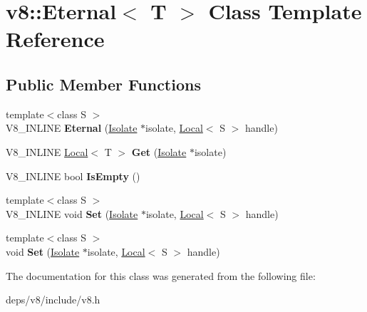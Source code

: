 \hypertarget{classv8_1_1_eternal}{}\section{v8\+:\+:Eternal$<$ T $>$ Class Template Reference}
\label{classv8_1_1_eternal}
\subsection*{Public Member Functions}
\begin{DoxyCompactItemize}
\item 
\hypertarget{classv8_1_1_eternal_ad7522d8b51e072dcbc4261bc1f155bcb}{}{\footnotesize template$<$class S $>$ }\\V8\+\_\+\+I\+N\+L\+I\+N\+E {\bfseries Eternal} (\hyperlink{classv8_1_1_isolate}{Isolate} $\ast$isolate, \hyperlink{classv8_1_1_local}{Local}$<$ S $>$ handle)\label{classv8_1_1_eternal_ad7522d8b51e072dcbc4261bc1f155bcb}

\item 
\hypertarget{classv8_1_1_eternal_ae9614309d9c93fe484d81926e31ed6b7}{}V8\+\_\+\+I\+N\+L\+I\+N\+E \hyperlink{classv8_1_1_local}{Local}$<$ T $>$ {\bfseries Get} (\hyperlink{classv8_1_1_isolate}{Isolate} $\ast$isolate)\label{classv8_1_1_eternal_ae9614309d9c93fe484d81926e31ed6b7}

\item 
\hypertarget{classv8_1_1_eternal_a5d77cbfe0662af5fe75172be9a8f1d5d}{}V8\+\_\+\+I\+N\+L\+I\+N\+E bool {\bfseries Is\+Empty} ()\label{classv8_1_1_eternal_a5d77cbfe0662af5fe75172be9a8f1d5d}

\item 
\hypertarget{classv8_1_1_eternal_a75a32f5c428a0d47e13f66dbdeb9adba}{}{\footnotesize template$<$class S $>$ }\\V8\+\_\+\+I\+N\+L\+I\+N\+E void {\bfseries Set} (\hyperlink{classv8_1_1_isolate}{Isolate} $\ast$isolate, \hyperlink{classv8_1_1_local}{Local}$<$ S $>$ handle)\label{classv8_1_1_eternal_a75a32f5c428a0d47e13f66dbdeb9adba}

\item 
\hypertarget{classv8_1_1_eternal_a2f9dcec02b2c2f7d4b55aee0d8b9881a}{}{\footnotesize template$<$class S $>$ }\\void {\bfseries Set} (\hyperlink{classv8_1_1_isolate}{Isolate} $\ast$isolate, \hyperlink{classv8_1_1_local}{Local}$<$ S $>$ handle)\label{classv8_1_1_eternal_a2f9dcec02b2c2f7d4b55aee0d8b9881a}

\end{DoxyCompactItemize}


The documentation for this class was generated from the following file\+:\begin{DoxyCompactItemize}
\item 
deps/v8/include/v8.\+h\end{DoxyCompactItemize}

